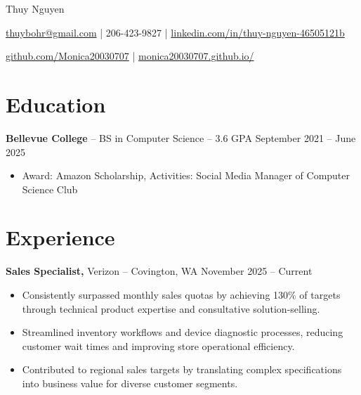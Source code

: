 \documentclass[11pt]{article}       %
\begin{document}
\centerline{\Huge Thuy Nguyen}

\vspace{5pt}

\centerline{\href{mailto:thuybohr@gmail.com}{thuybohr@gmail.com} | 206-423-9827 |
\href{https://www.linkedin.com/in/thuy-nguyen-46505121b/}{linkedin.com/in/thuy-nguyen-46505121b}}

\centerline{\href{https://github.com/Monica20030707}{github.com/Monica20030707} | 
\href{https://monica20030707.github.io/}{monica20030707.github.io/}} 

\vspace{-9pt}

\section*{Education}
\textbf{Bellevue College} -- BS in Computer Science -- 3.6 GPA \hfill September 2021 -- June 2025\\
\vspace{-9pt}
\begin{itemize}
  \item Award: Amazon Scholarship, Activities: Social Media Manager of Computer Science Club
\end{itemize}

\vspace{-18.5pt}

\section*{Experience}

\textbf{Sales Specialist,} {Verizon} -- Covington, WA \hfill November 2025 -- Current \\
\vspace{-9pt}
\begin{itemize}
  \item Consistently surpassed monthly sales quotas by achieving 130\% of targets through technical product expertise and consultative solution-selling.
  \item Streamlined inventory workflows and device diagnostic processes, reducing customer wait times and improving store operational efficiency.
  \item Contributed to regional sales targets by translating complex specifications into business value for diverse customer segments.
\end{itemize}
\end{document}
